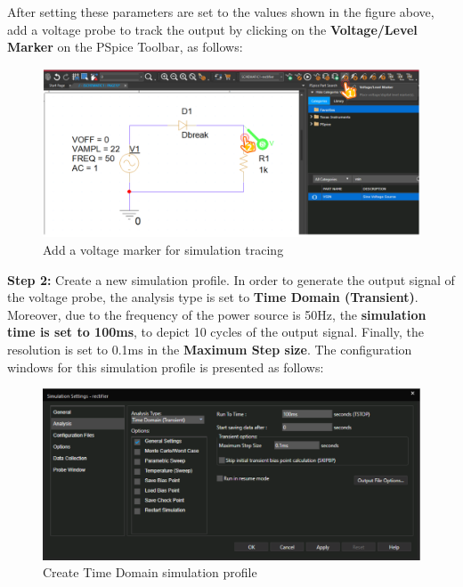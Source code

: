 After setting these parameters are set to the values shown in the figure above, add a voltage probe to track the output by clicking on the \textbf{Voltage/Level Marker} on the PSpice Toolbar, as follows:

\begin{figure}[!htp]
    \label{pic:halfwave_rectifier4}
    \centering
    \includegraphics[width = 5in]{source/picture/bai_2/diode_7.PNG}
    \caption{Add a voltage marker for simulation tracing}
    \label{lab02_ex031f}
\end{figure}

\textbf{Step 2: } Create a new simulation profile.
In order to generate the output signal of the voltage probe, the analysis type is set to \textbf{Time Domain (Transient)}. Moreover, due to the frequency of the power source is 50Hz, the \textbf{simulation time is set to 100ms}, to depict 10 cycles of the output signal. Finally, the resolution is set to 0.1ms in the \textbf{Maximum Step size}. The configuration windows for this simulation profile is presented as follows:

\begin{figure}[!htp]
    \label{pic:halfwave_rectifier5}
    \centering
    \includegraphics[width = 5in]{source/picture/bai_2/diode_8.PNG}
    \caption{Create Time Domain simulation profile}
    \label{lab02_ex031g}
\end{figure}


